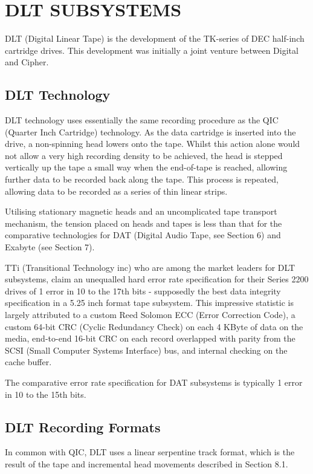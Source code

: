 \section {DLT SUBSYSTEMS}

DLT (Digital Linear Tape) is the development of the TK-series of DEC half-inch
cartridge drives. This development was initially a joint venture between
Digital and Cipher.

\subsection {DLT Technology}

DLT technology uses essentially the same recording procedure as the QIC
(Quarter Inch Cartridge) technology. As the data cartridge is inserted into the
drive, a non-spinning head lowers onto the tape. Whilst this action alone would
not allow a very high recording density to be achieved, the head is stepped
vertically up the tape a small way when the end-of-tape is reached, allowing
further data to be recorded back along the tape. This process is repeated,
allowing data to be recorded as a series of thin linear strips.

Utilising stationary magnetic heads and an uncomplicated tape transport
mechanism, the tension placed on heads and tapes is less than that for the
comparative technologies for DAT (Digital Audio Tape, see Section 6) and
Exabyte (see Section 7).

TTi (Transitional Technology inc) who are among the market leaders for DLT
subsystems, claim an unequalled hard error rate specification for their
Series 2200 drives of 1 error in 10 to the 17th bits - supposedly the best
data integrity specification in a 5.25 inch format tape subsystem. This
impressive statistic is largely attributed to a custom Reed Solomon ECC (Error
Correction Code), a custom 64-bit CRC (Cyclic Redundancy Check) on each 4 KByte
of data on the media, end-to-end 16-bit CRC on each record overlapped with
parity from the SCSI (Small Computer Systems Interface) bus, and internal
checking on the cache buffer.

The comparative error rate specification for DAT subsystems is typically
1 error in 10 to the 15th bits.

\subsection {DLT Recording Formats}

In common with QIC, DLT uses a linear serpentine track format, which is the
result of the tape and incremental head movements described in Section 8.1.

